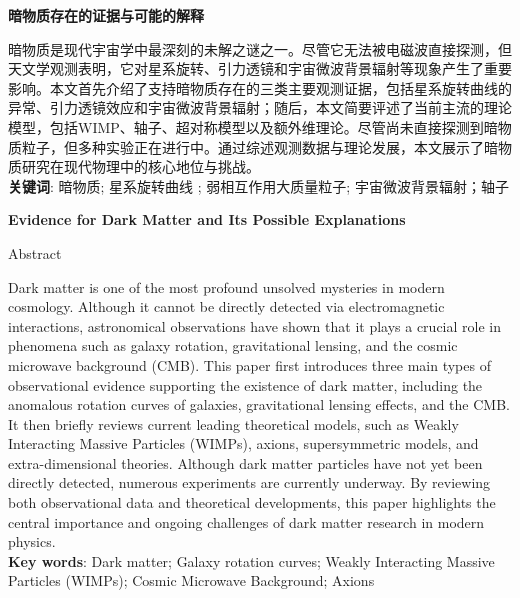 

\fontsize{12pt}{20pt}\selectfont %

\setcounter{page}{1}
\begin{center} %
	{\fontsize{16pt}{13pt}\selectfont\bf 暗物质存在的证据与可能的解释}
\end{center}
\begin{center}
{\fontsize{15.75pt}{13pt}\selectfont{\bf 摘~要}} \vspace{1.0cm}
\end{center}
暗物质是现代宇宙学中最深刻的未解之谜之一。尽管它无法被电磁波直接探测，但天文学观测表明，它对星系旋转、引力透镜和宇宙微波背景辐射等现象产生了重要影响。本文首先介绍了支持暗物质存在的三类主要观测证据，包括星系旋转曲线的异常、引力透镜效应和宇宙微波背景辐射；随后，本文简要评述了当前主流的理论模型，包括WIMP、轴子、超对称模型以及额外维理论。尽管尚未直接探测到暗物质粒子，但多种实验正在进行中。通过综述观测数据与理论发展，本文展示了暗物质研究在现代物理中的核心地位与挑战。\\
\textbf{\hei 关键词}: 暗物质;  星系旋转曲线 ;  弱相互作用大质量粒子; 宇宙微波背景辐射；轴子

\newpage
\fontsize{12pt}{18pt}\selectfont 
\begin{center} {\fontsize{15.75pt}{13pt}\selectfont\bf
Evidence for Dark Matter and Its Possible Explanations}\end{center}
\begin{center}
{\large Abstract} \vspace{1.0cm}
\end{center}
Dark matter is one of the most profound unsolved mysteries in modern cosmology. Although it cannot be directly detected via electromagnetic interactions, astronomical observations have shown that it plays a crucial role in phenomena such as galaxy rotation, gravitational lensing, and the cosmic microwave background (CMB). This paper first introduces three main types of observational evidence supporting the existence of dark matter, including the anomalous rotation curves of galaxies, gravitational lensing effects, and the CMB. It then briefly reviews current leading theoretical models, such as Weakly Interacting Massive Particles (WIMPs), axions, supersymmetric models, and extra-dimensional theories. Although dark matter particles have not yet been directly detected, numerous experiments are currently underway. By reviewing both observational data and theoretical developments, this paper highlights the central importance and ongoing challenges of dark matter research in modern physics. \\
\textbf{Key words}: Dark matter; Galaxy rotation curves; Weakly Interacting Massive Particles (WIMPs); Cosmic Microwave Background; Axions

\newpage
